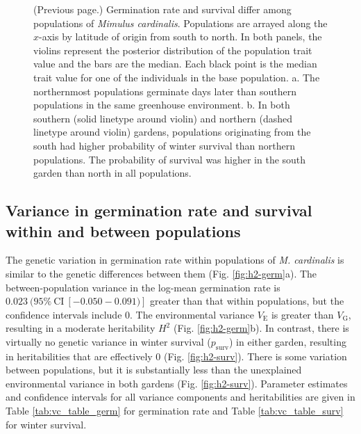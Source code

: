 \documentclass[
  12pt,
]{article}
\begin{document}
\begin{figure} [t!]
  \caption{(Previous page.) Germination rate and survival differ among populations of \textit{Mimulus cardinalis}. Populations are arrayed along the $x$-axis by latitude of origin from south to north. In both panels, the violins represent the posterior distribution of the population trait value and the bars are the median. Each black point is the median trait value for one of the individuals in the base population. a. The northernmost populations germinate days later than southern populations in the same greenhouse environment. b. In both southern (solid linetype around violin) and northern (dashed linetype around violin) gardens, populations originating from the south had higher probability of winter survival than northern populations. The probability of survival was higher in the south garden than north in all populations.}
\end{figure}

\hypertarget{variance-in-germination-rate-and-survival-within-and-between-populations}{%
\subsection{Variance in germination rate and survival within and between populations}\label{variance-in-germination-rate-and-survival-within-and-between-populations}}

The genetic variation in germination rate within populations of \emph{M. cardinalis} is similar to the genetic differences between them (Fig. \ref{fig:h2-germ}a). The between-population variance in the log-mean germination rate is \(0.023~(95\%~\text{CI}~[-0.050-0.091)]\) greater than that within populations, but the confidence intervals include 0. The environmental variance \(V_\text{E}\) is greater than \(V_\text{G}\), resulting in a moderate heritability \(H^2\) (Fig. \ref{fig:h2-germ}b). In contrast, there is virtually no genetic variance in winter survival (\(p_\text{surv}\)) in either garden, resulting in heritabilities that are effectively 0 (Fig. \ref{fig:h2-surv}). There is some variation between populations, but it is substantially less than the unexplained environmental variance in both gardens (Fig. \ref{fig:h2-surv}). Parameter estimates and confidence intervals for all variance components and heritabilities are given in Table \ref{tab:vc_table_germ} for germination rate and Table \ref{tab:vc_table_surv} for winter survival.
\end{document}
